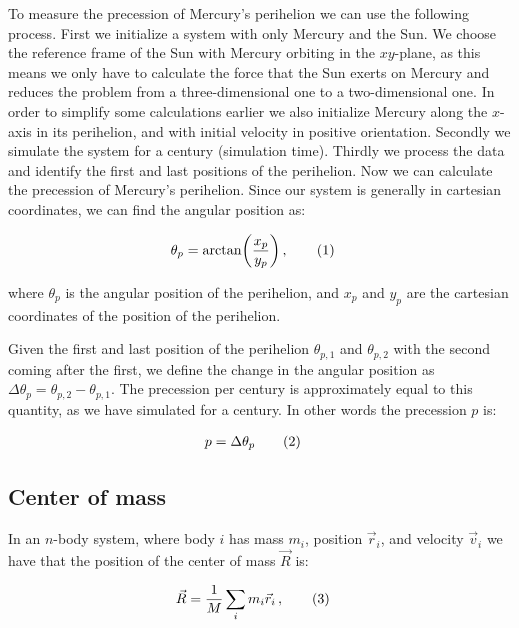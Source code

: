 \documentclass[reprint,english,notitlepage]{revtex4-1}  %
\newcommand\numberthis{\addtocounter{equation}{1}\tag{\theequation}}
\begin{document}
To measure the precession of Mercury's perihelion we can use the following process. First we initialize a system with only Mercury and the Sun. We choose the reference frame of the Sun with Mercury orbiting in the $xy$-plane, as this means we only have to calculate the force that the Sun exerts on Mercury and reduces the problem from a three-dimensional one to a two-dimensional one. In order to simplify some calculations earlier we also initialize Mercury along the $x$-axis in its perihelion, and with initial velocity in positive orientation. Secondly we simulate the system for a century (simulation time). Thirdly we process the data and identify the first and last positions of the perihelion. Now we can calculate the precession of Mercury's perihelion. Since our system is generally in cartesian coordinates, we can find the angular position as:

\begin{align*}
\theta_p &= \arctan(\frac{x_p}{y_p}) \, ,\numberthis \label{eq:prec_ang_pos}
\end{align*}

where $\theta_p$ is the angular position of the perihelion, and $x_p$ and $y_p$ are the cartesian coordinates of the position of the perihelion.

Given the first and last position of the perihelion $\theta_{p,1}$ and $\theta_{p,2}$ with the second coming after the first, we define the change in the angular position as $\Delta \theta_p = \theta_{p,2} - \theta_{p,1}$. The precession per century is approximately equal to this quantity, as we have simulated for a century. In other words the precession $p$ is:

\begin{align*}
p &= \Delta \theta_p \numberthis \label{eq:precession}
\end{align*}

\subsection{Center of mass} \label{sec:II:g}

In an $n$-body system, where body $i$ has mass $m_i$, position $\vec{r}_i$, and velocity $\vec{v}_i$ we have that the position of the center of mass $\vec{R}$ is:

\begin{align*}
\vec{R} &= \frac{1}{M}\sum\limits_i m_i \vec{r}_i \, , \numberthis \label{eq:cofm_pos}
\end{align*}
\end{document}
